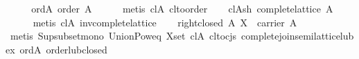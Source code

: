 \begin{isabellebody}
%
\isadelimproof
%
\endisadelimproof
%
\isatagproof
{}\isamarkupfalse%
\ {}\isanewline
\ \ \isamarkupfalse%
\ ord{}A{}\ {}order\ A{}\isanewline
\ \ \ \ \isamarkupfalse%
\ {}metis\ cl{}A\ cl{}to{}order{}\isanewline
\isanewline
\ \ \isamarkupfalse%
\ cl{}Ash{}\ {}complete{}lattice\ {}A{}{}{}\isanewline
\ \ \ \ \isamarkupfalse%
\ {}metis\ cl{}A\ inv{}complete{}lattice{}\isanewline
\isanewline
\ \ \isamarkupfalse%
\ right{}closed{}\ {}{}\isactrlbsub A\ X{}\ {}\ carrier\ A{}\isanewline
\ \ \ \ \isamarkupfalse%
\ {}metis\ Sup{}subset{}mono\ Union{}Pow{}eq\ X{}set\ cl{}A\ cl{}to{}cjs\ complete{}join{}semilattice{}lub{}ex\ ord{}A\ order{}lub{}closed{}\isanewline
\ \ \isamarkupfalse%

\end{isabellebody}
